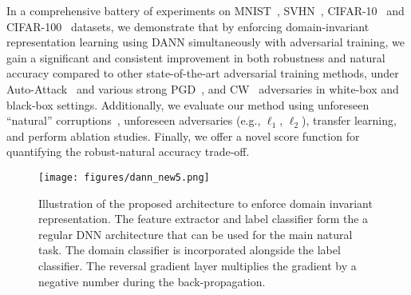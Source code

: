 In a comprehensive battery of experiments on MNIST~\citep{lecun1998gradient}, SVHN~\citep{netzer2011reading}, CIFAR-10~\citep{krizhevsky2009learning} and CIFAR-100~\citep{krizhevsky2009learning} datasets,
we demonstrate that by enforcing domain-invariant representation learning using DANN simultaneously with adversarial training, we gain a significant and consistent improvement in both robustness and natural accuracy compared to other state-of-the-art adversarial training methods, under Auto-Attack~\citep{croce2020reliable} and various strong PGD~\citep{madry2017towards}, and CW~\citep{carlini2017towards} adversaries in white-box and black-box settings. 
Additionally, we evaluate our method using unforeseen ``natural'' corruptions~\citep{hendrycks2018benchmarking}, unforeseen adversaries (e.g., $\ell_{1}$, $\ell_{2}$), transfer  learning, and perform ablation studies.
Finally, we offer a novel score function for  quantifying the robust-natural accuracy trade-off.

\begin{figure}[H]
  \centering
  \texttt{[image: figures/dann\_new5.png]}
  \caption{Illustration of the proposed architecture to enforce domain invariant representation. The feature extractor and label classifier form the a regular DNN architecture that can be used for the main natural task. The domain classifier is incorporated alongside the label classifier. The reversal gradient layer multiplies the gradient by a negative number during the back-propagation.}
  \label{dann}
\end{figure}
